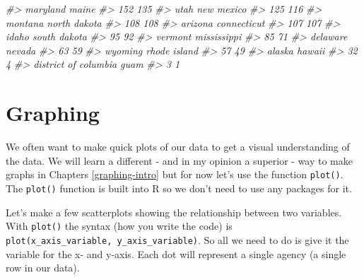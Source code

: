 \documentclass[
]{krantz}
\makeatletter
\newenvironment{Shaded}{\begin{snugshade}}{\end{snugshade}}
\newcommand{\CommentTok}[1]{\textcolor[rgb]{0.37,0.37,0.37}{\textit{#1}}}
\newenvironment{kframe}{%
\medskip{}
\setlength{\fboxsep}{.8em}
 \def\at@end@of@kframe{}%
 \ifinner\ifhmode%
  \def\at@end@of@kframe{\end{minipage}}%
  \begin{minipage}{\columnwidth}%
 \fi\fi%
 \def\FrameCommand##1{\hskip\@totalleftmargin \hskip-\fboxsep
 \colorbox{shadecolor}{##1}\hskip-\fboxsep
     \hskip-\linewidth \hskip-\@totalleftmargin \hskip\columnwidth}%
 \MakeFramed {\advance\hsize-\width
   \@totalleftmargin\z@ \linewidth\hsize
   \@setminipage}}%
 {\par\unskip\endMakeFramed%
 \at@end@of@kframe}
\renewenvironment{Shaded}{\begin{kframe}}{\end{kframe}}
\makeatother
\begin{document}
\begin{Shaded}
\begin{Highlighting}[]
\CommentTok{\#\textgreater{}             maryland                maine }
\CommentTok{\#\textgreater{}                  152                  135 }
\CommentTok{\#\textgreater{}                 utah           new mexico }
\CommentTok{\#\textgreater{}                  125                  116 }
\CommentTok{\#\textgreater{}              montana         north dakota }
\CommentTok{\#\textgreater{}                  108                  108 }
\CommentTok{\#\textgreater{}              arizona          connecticut }
\CommentTok{\#\textgreater{}                  107                  107 }
\CommentTok{\#\textgreater{}                idaho         south dakota }
\CommentTok{\#\textgreater{}                   95                   92 }
\CommentTok{\#\textgreater{}              vermont          mississippi }
\CommentTok{\#\textgreater{}                   85                   71 }
\CommentTok{\#\textgreater{}             delaware               nevada }
\CommentTok{\#\textgreater{}                   63                   59 }
\CommentTok{\#\textgreater{}              wyoming         rhode island }
\CommentTok{\#\textgreater{}                   57                   49 }
\CommentTok{\#\textgreater{}               alaska               hawaii }
\CommentTok{\#\textgreater{}                   32                    4 }
\CommentTok{\#\textgreater{} district of columbia                 guam }
\CommentTok{\#\textgreater{}                    3                    1}
\end{Highlighting}
\end{Shaded}

\hypertarget{graphing-1}{%
\section{Graphing}\label{graphing-1}}

We often want to make quick plots of our data to get a visual understanding of the data. We will learn a different - and in my opinion a superior - way to make graphs in Chapters \ref{graphing-intro} but for now let's use the function \texttt{plot()}. The \texttt{plot()} function is built into R so we don't need to use any packages for it.

Let's make a few scatterplots showing the relationship between two variables. With \texttt{plot()} the syntax (how you write the code) is \texttt{plot(x\_axis\_variable,\ y\_axis\_variable)}. So all we need to do is give it the variable for the x- and y-axis. Each dot will represent a single agency (a single row in our data).
\end{document}
